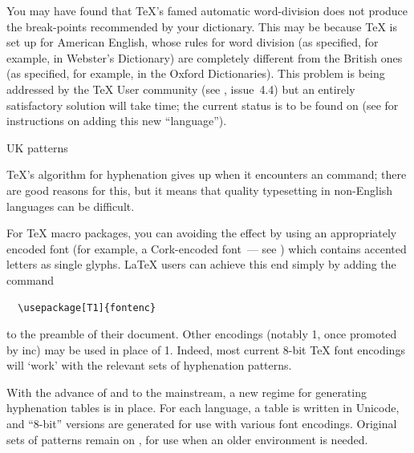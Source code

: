 
You may have found that \TeX{}'s famed automatic word-division does
not produce the break-points recommended by your dictionary. This may be
because \TeX{} is set up for American English, whose rules for word
division (as specified, for example, in Webster's Dictionary) are
completely different from the British ones (as specified, for example,
in the Oxford Dictionaries). This problem is being addressed by the 
\TeX{} User community (see \BV{}, issue~4.4) but an entirely
satisfactory solution will take time; the current status is to be
found on  (see
 for instructions
on adding this new ``language'').
\begin{ctanrefs}
\item[UK patterns]
\end{ctanrefs}


\TeX{}'s algorithm for hyphenation gives up when it encounters an
 command; there are good reasons for this, but it means
that quality typesetting in non-English languages can be difficult.

For \TeX{} macro packages, you can avoiding the effect by using an
appropriately encoded font (for example, a Cork-encoded font~--- see
) which contains accented
letters as single glyphs.  \LaTeX{} users can achieve this end simply
by adding the command
\begin{verbatim}
  \usepackage[T1]{fontenc}
\end{verbatim}
to the preamble of their document.  Other encodings (notably
1, once promoted by \YandY{} inc) may be used
in place of 1.  Indeed, most current 8-bit \TeX{} font
encodings will `work' with the relevant sets of hyphenation patterns. 

With the advance of \xetex{} and \luatex{} to the mainstream, a new
regime for generating hyphenation tables is in place.  For each
language, a table is written in Unicode, and ``8-bit'' versions are
generated for use with various \latex{} font encodings.  Original sets
of patterns remain on , for use when an older environment
is needed.


